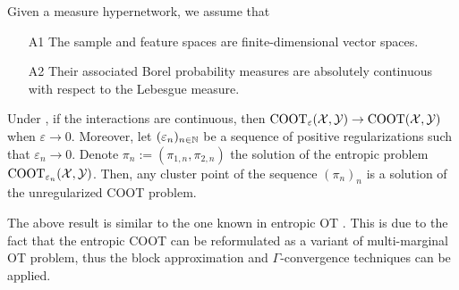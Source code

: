 \begin{assumption}
  \label{assump:ent_coot}
  Given a measure hypernetwork, we assume that
  \begin{enumerate}
    \item[A1] The sample and feature spaces are finite-dimensional vector spaces.
    \item[A2] Their associated Borel probability measures are absolutely continuous
    with respect to the Lebesgue measure.
  \end{enumerate}
\end{assumption}
\begin{proposition} \label{prop:conv_ent_coot}
  Under , if the interactions are continuous, then
  $\text{COOT}_{\varepsilon}(\mathcal X, \mathcal Y) \to \text{COOT}(\mathcal X, \mathcal Y)$ when $\varepsilon \to 0$. Moreover,
  let $(\varepsilon_n)_{n \in \mathbb N}$ be a sequence of
  positive regularizations such that $\varepsilon_n \to 0$.
  Denote $\pi_n := (\pi_{1, n}, \pi_{2, n})$ the solution of the entropic problem
  $\text{COOT}_{\varepsilon_n} (\mathcal X, \mathcal Y)$. Then, any cluster point of the sequence $(\pi_n)_n$ is
  a solution of the unregularized COOT problem.
\end{proposition}
The above result is similar to the one known in entropic OT \citep{Carlier17}. This is due to the fact
that the entropic COOT can be reformulated as a variant of multi-marginal OT problem,
thus the block approximation and $\Gamma$-convergence techniques can be applied.


